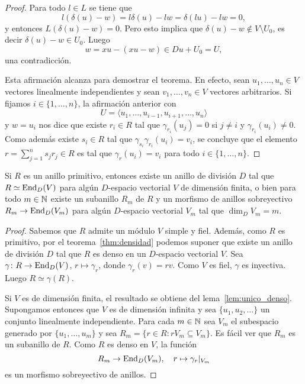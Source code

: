 \begin{proof}
	Para todo $l\in L$ se tiene que 
	\[
		l(\delta(u)-w)=l\delta(u)-lw=\delta(lu)-lw=0,
	\]
	y entonces $L(\delta(u)-w)=0$. Pero esto implica que $\delta(u)-w\not\in V\setminus U_0$, es
	decir $\delta(u)-w\in U_0$. Luego 
	\[
		w=xu-(xu-w)\in Du+U_0=U,
	\]
	una contradicción. 

	Esta afirmación alcanza para demostrar el teorema. En efecto, sean
	$u_1,\dots,u_n\in V$ vectores linealmente independientes y sean
	$v_1,\dots,v_n\in V$ vectores arbitrarios. Si fijamos $i\in\{1,\dots,n\}$, la afirmación anterior con
	\[
		U=\langle u_1,\dots,u_{i-1},u_{i+1},\dots,u_n\rangle
	\]
	y $w=u_i$ nos dice que existe $r_i\in R$ tal que $\gamma_{r_i}(u_j)=0$ si
	$j\ne i$ y $\gamma_{r_i}(u_i)\ne 0$. Como además existe $s_i\in R$ tal que
	$\gamma_{s_i}\gamma_{r_i}(u_i)=v_i$, se concluye que el elemento
	$r=\sum_{j=1}^n s_jr_j\in R$ es tal que $\gamma_r(u_i)=v_i$ para todo
	$i\in\{1,\dots,n\}$.
\end{proof}


\begin{corollary}
	Si $R$ es un anillo primitivo, entonces existe un anillo de división $D$
	tal que $R\simeq\operatorname{End}_D(V)$ para algún $D$-espacio vectorial $V$ de
	dimensión finita, o bien para todo $m\in\mathbb{N}$ existe un subanillo $R_m$ de
	$R$ y un morfismo de anillos sobreyectivo $R_m\to\operatorname{End}_D(V_m)$ para algún $D$-espacio
	vectorial $V_m$ tal que $\dim_DV_m=m$.
\end{corollary}

\begin{proof}
	Sabemos que $R$ admite un módulo $V$ simple y fiel. Además, como $R$ es
	primitivo, por el teorema~\ref{thm:densidad} podemos suponer que existe un
	anillo de división $D$ tal que $R$ es denso en un $D$-espacio vectorial
	$V$.  Sea $\gamma\colon R\to\operatorname{End}_D(V)$, $r\mapsto\gamma_r$, donde
	$\gamma_r(v)=rv$. Como $V$ es fiel, $\gamma$ es inyectiva. Luego
	$R\simeq\gamma(R)$. 

	Si $V$ es de dimensión finita, el resultado se obtiene del
	lema~\ref{lem:unico_denso}.  Supongamos entonces que $V$ es de dimensión
	infinita y sea $\{u_1,u_2,\dots\}$ un conjunto linealmente independiente.
	Para cada $m\in\mathbb{N}$ sea $V_m$ el subespacio generado por $\{u_1,\dots,u_m\}$
	y sea $R_m=\{r\in R:rV_m\subseteq V_m\}$. Es fácil ver que $R_m$ es un
	subanillo de $R$. Como $R$ es denso en $V$, la función
	\[
		R_m\to \operatorname{End}_D(V_m),\quad
		r\mapsto\gamma_r|_{V_m}
	\]
	es un morfismo sobreyectivo de anillos. 
\end{proof}

